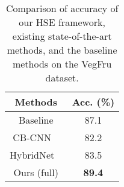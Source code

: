 \documentclass[sigconf]{acmart}
\begin{document}
\begin{table}[htp]
\centering
\begin{tabular}{c|c}
\hline
\centering  Methods  & Acc. (\%) \\
\hline
\hline
Baseline & 87.1  \\
\hline
\hline
CB-CNN ~\cite{gao2016compact} & 82.2 \\
HybridNet ~\cite{hou2017vegfru} & 83.5 \\
\hline
\hline
Ours (full)  & \textbf{89.4} \\
\hline
\end{tabular}
\caption{Comparison of accuracy of our HSE framework, existing state-of-the-art methods, and the baseline methods on the VegFru dataset. }
\label{table:vegfru}
\end{table}


\end{document}
